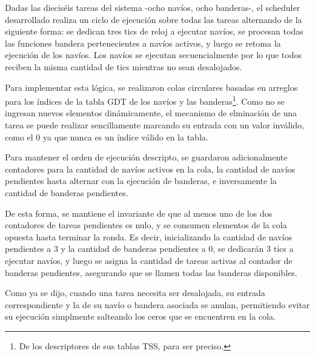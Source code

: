 
Dadas las dieciséis tareas del sistema -ocho navíos, ocho banderas-, el scheduler desarrollado realiza un ciclo de ejecución sobre todas las tareas alternando de la siguiente forma: se dedican tres tics de reloj a ejecutar navíos, se procesan todas las funciones bandera pertenecientes a navíos activos, y luego se retoma la ejecución de los navíos. Los navíos se ejecutan secuencialmente por lo que todos reciben la misma cantidad de tics mientras no sean desalojados.

Para implementar esta lógica, se realizaron colas circulares basadas en arreglos para los índices de la tabla GDT de los navíos y las banderas\footnote{De los descriptores de sus tablas TSS, para ser preciso.}. Como no se ingresan nuevos elementos dinámicamente, el mecanismo de elminación de una tarea se puede realizar sencillamente marcando su entrada con un valor inválido, como el 0 ya que nunca es un índice válido en la tabla.

Para mantener el orden de ejecución descripto, se guardaron adicionalmente contadores para la cantidad de navíos activos en la cola, la cantidad de navíos pendientes hasta alternar con la ejecución de banderas, e inversamente la cantidad de banderas pendientes.

De esta forma, se mantiene el invariante de que al menos uno de los dos contadores de tareas pendientes es nulo, y se consumen elementos de la cola opuesta hasta terminar la ronda. Es decir, inicializando la cantidad de navíos pendientes a 3 y la cantidad de banderas pendientes a 0, se dedicarán 3 tics a ejecutar navíos, y luego se asigna la cantidad de tareas activas al contador de banderas pendientes, asegurando que se llamen todas las banderas disponibles.

Como ya se dijo, cuando una tarea necesita ser desalojada, su entrada correspondiente y la de su navío o bandera asociada se anulan, permitiendo evitar su ejecución simplmente salteando los ceros que se encuentren en la cola.

